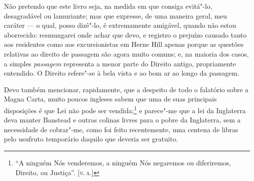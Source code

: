{{{{{{{{{{{{{{{{{%
Não pretendo que este livro seja, na medida em que consiga evitá"-lo,
desagradável ou lamuriante; mas que expresse, de uma maneira geral, meu
caráter --- o qual, posso dizê"-lo, é extremamente amigável, quando não
estou aborrecido: resmungarei onde achar que devo, e registro o prejuízo
causado tanto aos residentes como aos excursionistas em Herne Hill 
apenas porque as questões relativas ao direito de passagem são agora
muito comuns; e, na maioria dos casos, a simples \textit{passagem}
representa a menor parte do Direito antigo, propriamente entendido. O
Direito refere"-se à bela vista e ao bom ar ao longo da passagem.

Devo também mencionar, rapidamente, que a despeito de todo o falatório
sobre a Magna Carta, muito poucos ingleses sabem que uma de suas
principais disposições é que Lei não pode ser vendida;\footnote{``A
  ninguém Nós venderemos, a ninguém Nós negaremos ou diferiremos,
  Direito, ou Justiça''. {[}\textsc{n.\,a.}{]}} e parece"-me que a lei da
Inglaterra deva manter Banstead e outras colinas livres para o pobre da
Inglaterra, sem a necessidade de cobrar"-me, como foi feito recentemente,
uma centena de libras pelo usufruto temporário daquilo que deveria ser
gratuito.

}}}}}}}}}}}}}}}}}
